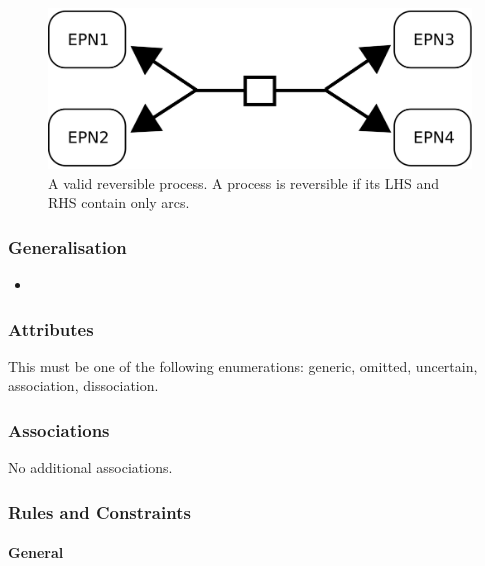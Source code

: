 \begin{figure}[htb]
  \centering
  \includegraphics[scale = 0.4]{images/reversible_process}
  \caption{A valid reversible process. A process is reversible if its LHS and RHS contain only  arcs.}
  \label{fig:techref:process-reversibility}
\end{figure}

\subsubsection{Generalisation}

\begin{itemize}
\item {}
\end{itemize}

\subsubsection{Attributes}

\begin{attributes}
   This must be one of the following
  enumerations: generic, omitted, uncertain, association, dissociation.
\end{attributes}

\subsubsection{Associations}

No additional associations.

\subsubsection{Rules and Constraints}

\paragraph{General}

